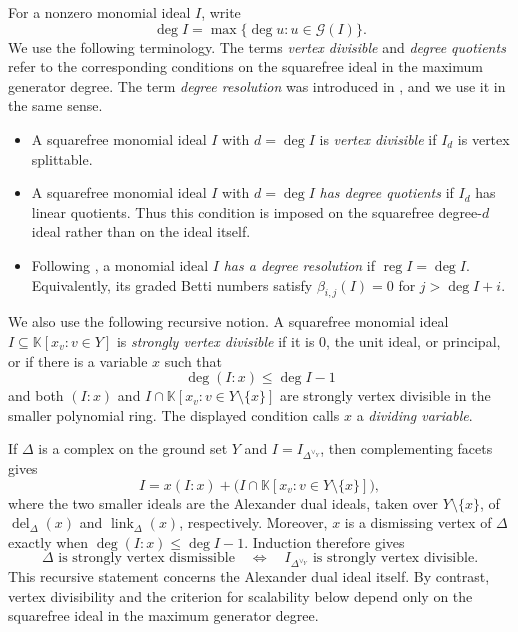 \documentclass[11pt]{amsart}
\newcommand{\K}{\mathbb K}
\DeclareMathOperator{\link}{link}
\DeclareMathOperator{\del}{del}
\DeclareMathOperator{\reg}{reg}
\theoremstyle{definition}
\begin{document}
	For a nonzero monomial ideal $I$, write
	\[
	\deg I=\max\{\deg u:u\in\mathcal G(I)\}.
	\]
	We use the following terminology. The terms \emph{vertex divisible} and \emph{degree quotients} refer to the corresponding conditions on the squarefree ideal in the maximum generator degree. The term \emph{degree resolution} was introduced in \cite[Definition~3.1]{Namiq2026Skeletons}, and we use it in the same sense.
	\begin{itemize}
		\item A squarefree monomial ideal $I$ with $d=\deg I$ is \emph{vertex divisible} if $I_d$ is vertex splittable.
		\item A squarefree monomial ideal $I$ with $d=\deg I$ \emph{has degree quotients} if $I_d$ has linear quotients.  Thus this condition is imposed on the squarefree degree-$d$ ideal rather than on the ideal itself.
		\item Following \cite[Definition~3.1]{Namiq2026Skeletons}, a monomial ideal $I$ \emph{has a degree resolution} if $\reg I=\deg I$. Equivalently, its graded Betti numbers satisfy $\beta_{i,j}(I)=0$ for $j>\deg I+i$.
	\end{itemize}
	
	We also use the following recursive notion. A squarefree monomial ideal $I\subseteq\K[x_v:v\in Y]$ is \emph{strongly vertex divisible} if it is $0$, the unit ideal, or principal, or if there is a variable $x$ such that
	\[
	\deg(I:x)\leq\deg I-1
	\]
	and both $(I:x)$ and $I\cap\K[x_v:v\in Y\setminus\{x\}]$ are strongly vertex divisible in the smaller polynomial ring.  The displayed condition calls $x$ a \emph{dividing variable}.
	
	If $\Delta$ is a complex on the ground set $Y$ and $I=I_{\Delta^{\vee_Y}}$, then complementing facets gives
	\[
	I=x(I:x)+\bigl(I\cap\K[x_v:v\in Y\setminus\{x\}]\bigr),
	\]
	where the two smaller ideals are the Alexander dual ideals, taken over $Y\setminus\{x\}$, of $\del_\Delta(x)$ and $\link_\Delta(x)$, respectively.  Moreover, $x$ is a dismissing vertex of $\Delta$ exactly when $\deg(I:x)\leq\deg I-1$.  Induction therefore gives
	\[
	\Delta\text{ is strongly vertex dismissible}
	\quad\Longleftrightarrow\quad
	I_{\Delta^{\vee_Y}}\text{ is strongly vertex divisible}.
	\]
	This recursive statement concerns the Alexander dual ideal itself. By contrast, vertex divisibility and the criterion for scalability below depend only on the squarefree ideal in the maximum generator degree.
	
\end{document}
